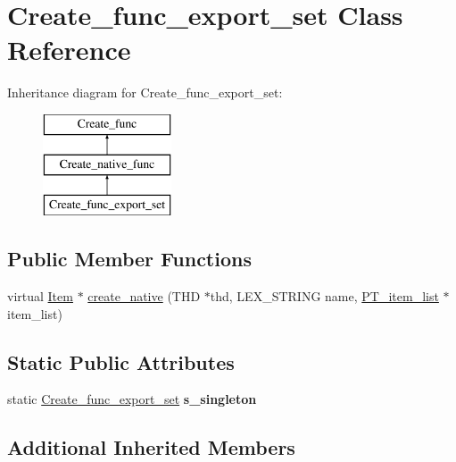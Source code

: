 \hypertarget{classCreate__func__export__set}{}\section{Create\+\_\+func\+\_\+export\+\_\+set Class Reference}
\label{classCreate__func__export__set}
Inheritance diagram for Create\+\_\+func\+\_\+export\+\_\+set\+:\begin{figure}[H]
\begin{center}
\leavevmode
\includegraphics[height=3.000000cm]{classCreate__func__export__set}
\end{center}
\end{figure}
\subsection*{Public Member Functions}
\begin{DoxyCompactItemize}
\item 
virtual \mbox{\hyperlink{classItem}{Item}} $\ast$ \mbox{\hyperlink{classCreate__func__export__set_a52c8daab9c206e6daeb20865a98b8ba9}{create\+\_\+native}} (T\+HD $\ast$thd, L\+E\+X\+\_\+\+S\+T\+R\+I\+NG name, \mbox{\hyperlink{classPT__item__list}{P\+T\+\_\+item\+\_\+list}} $\ast$item\+\_\+list)
\end{DoxyCompactItemize}
\subsection*{Static Public Attributes}
\begin{DoxyCompactItemize}
\item 
\mbox{\label{classCreate__func__export__set_a6bd4d44add4809eb42a7698c8c6c77d4}} 
static \mbox{\hyperlink{classCreate__func__export__set}{Create\+\_\+func\+\_\+export\+\_\+set}} {\bfseries s\+\_\+singleton}
\end{DoxyCompactItemize}
\subsection*{Additional Inherited Members}


